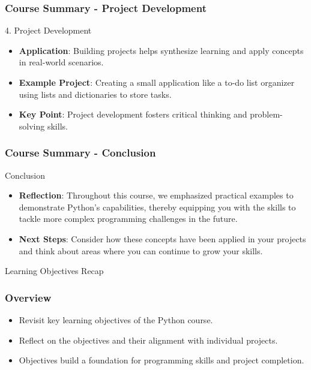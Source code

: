 \documentclass{beamer}
\begin{document}
\begin{frame}[fragile]
    \frametitle{Course Summary - Project Development}
    \begin{block}{4. Project Development}
        \begin{itemize}
            \item \textbf{Application}: Building projects helps synthesize learning and apply concepts in real-world scenarios.
            \item \textbf{Example Project}: Creating a small application like a to-do list organizer using lists and dictionaries to store tasks.
            \item \textbf{Key Point}: Project development fosters critical thinking and problem-solving skills.
        \end{itemize}
    \end{block}
\end{frame}

\begin{frame}[fragile]
    \frametitle{Course Summary - Conclusion}
    \begin{block}{Conclusion}
        \begin{itemize}
            \item \textbf{Reflection}: Throughout this course, we emphasized practical examples to demonstrate Python's capabilities, thereby equipping you with the skills to tackle more complex programming challenges in the future. 
            \item \textbf{Next Steps}: Consider how these concepts have been applied in your projects and think about areas where you can continue to grow your skills.
        \end{itemize}
    \end{block}
\end{frame}

\begin{frame}{Learning Objectives Recap}
    \frametitle{Overview}
    \begin{itemize}
        \item Revisit key learning objectives of the Python course.
        \item Reflect on the objectives and their alignment with individual projects.
        \item Objectives build a foundation for programming skills and project completion.
    \end{itemize}
\end{frame}
\end{document}
